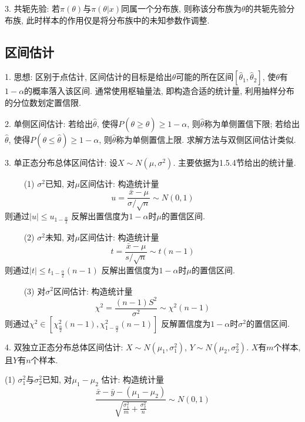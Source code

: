 3. 共轭先验: 若$\pi(\theta)$与$\pi(\theta|x)$同属一个分布族, 则称该分布族为$\theta$的共轭先验分布族, 此时样本的作用仅是将分布族中的未知参数作调整.

\subsection{区间估计}

1. 思想: 区别于点估计, 区间估计的目标是给出$\theta$可能的所在区间$[\hat{\theta}_1,\hat{\theta}_2]$, 使$\theta$有$1-\alpha$的概率落入该区间. 通常使用枢轴量法, 即构造合适的统计量, 利用抽样分布的分位数划定置信限.

2. 单侧区间估计: 若给出$\hat{\theta}$, 使得$P(\theta \geq \hat{\theta})\geq 1-\alpha$, 则$\hat{\theta}$称为单侧置信下限; 若给出$\hat{\theta}$, 使得$P(\theta \leq \hat{\theta})\geq 1-\alpha$, 则$\hat{\theta}$称为单侧置信上限. 求解方法与双侧区间估计类似.

3. 单正态分布总体区间估计: 设$X \sim N(\mu, \sigma^2)$. 主要依据为1.5.4节给出的统计量.

~~~~ (1) $\sigma^2$已知, 对$\mu$区间估计: 构造统计量
\begin{equation*}
    u=\frac{\bar{x}-\mu}{\sigma/\sqrt{n}} \sim N(0,1)
\end{equation*}
则通过$|u| \leq u_{1-\frac{\alpha}{2}}$ 反解出置信度为$1-\alpha$时$\mu$的置信区间.

~~~~ (2) $\sigma^2$未知, 对$\mu$区间估计: 构造统计量
\begin{equation*}
    t=\frac{\bar{x}-\mu}{s/\sqrt{n}} \sim t(n-1)
\end{equation*}
则通过$|t| \leq t_{1-\frac{\alpha}{2}}(n-1)$ 反解出置信度为$1-\alpha$时$\mu$的置信区间.

~~~~ (3) 对$\sigma^2$区间估计: 构造统计量
\begin{equation*}
    \chi^2=\frac{(n-1)S^2}{\sigma^2} \sim \chi^2(n-1)
\end{equation*}
则通过$\chi^2 \in [\chi^2_{\frac{\alpha}{2}}(n-1),\chi^2_{1-\frac{\alpha}{2}}(n-1)]$ 反解置信度为$1-\alpha$时$\sigma^2$的置信区间.


4. 双独立正态分布总体区间估计: $X\sim N(\mu_1,\sigma_1^2)$, $Y \sim N(\mu_2,\sigma_2^2)$. $X$有$m$个样本, 且$Y$有$n$个样本.

(1) $\sigma_1^2$与$\sigma_2^2$已知, 对$\mu_1-\mu_2$ 估计: 构造统计量
\begin{equation*}
    \frac{\bar{x}-\bar{y}-(\mu_1-\mu_2)}{\sqrt{\frac{\sigma_1^2}{m}+\frac{\sigma_2^2}{n}}} \sim N(0,1)
\end{equation*}

